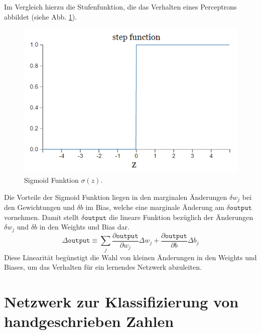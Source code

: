 \noindent
Im Vergleich hierzu die Stufenfunktion, die das Verhalten eines Perceptrons abbildet (siehe Abb. \ref{fig:perceptron_plot}).
\begin{figure}[hbt]
	\centering
	\includegraphics[scale=0.6]{Bilder/perceptron_plot}
	\caption{Sigmoid Funktion $\sigma(z)$.} 
	\label{fig:perceptron_plot} 
\end{figure}
Die Vorteile der Sigmoid Funktion liegen in den marginalen Änderungen $\delta w_j$ bei den Gewichtungen und $\delta b$ im Bias, welche eine marginale Änderung am $\delta\mathtt{output}$ vornehmen. Damit stellt $\delta\mathtt{output}$ die lineare Funktion bezüglich der Änderungen  $\delta w_j$ und $\delta b$ in den Weights und Bias dar.
\begin{equation}
	\Delta\mathtt{output} \equiv \sum_{j}{\frac{\partial\mathtt{output}}{\partial w_j}\Delta w_j+\frac{\partial\mathtt{output}}{\partial b}\Delta b_j}
\end{equation}
Diese Linearität begünstigt die Wahl von kleinen Änderungen in den Weights und Biases, um das Verhalten für ein lernendes Netzwerk abzuleiten.   

\section{Netzwerk zur Klassifizierung von handgeschrieben Zahlen}
